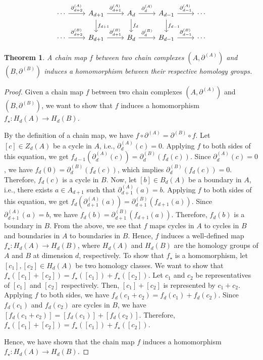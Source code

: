 \documentclass{amsart}
\newtheorem{theorem}[section]{Theorem}
\begin{document}
\begin{equation}
\begin{tikzcd}
\cdots \arrow[r, "\partial^{(A)}_{d+2}"] & A_{d+1} \arrow[r, "\partial^{(A)}_{d+1}"] \arrow[d, "f_{d+1}"] & A_d \arrow[r, "\partial^{(A)}_{d}"] \arrow[d, "f_d"] & A_{d-1} \arrow[r, "\partial^{(A)}_{d-1}"] \arrow[d, "f_{d-1}"] & \cdots \\
\cdots \arrow[r, "\partial^{(B)}_{d+2}"] & B_{d+1} \arrow[r, "\partial^{(B)}_{d+1}"]                                  & B_d \arrow[r, "\partial^{(B)}_d"]                              & B_{d-1} \arrow[r, "\partial^{(B)}_{d-1}"]                                  & \cdots
\end{tikzcd}
\end{equation}

\begin{theorem}
\label{chainmaps}
A chain map $f$ between two chain complexes $(A, \partial^{(A)})$ and $(B,\partial^{(B)})$ induces a homomorphism between their respective homology groups.
\end{theorem}

\begin{proof}
Given a chain map $f$ between two chain complexes $(A, \partial^{(A)})$ and $(B,\partial^{(B)})$, we want to show that $f$ induces a homomorphism $f_\star: H_d(A) \rightarrow H_d(B)$.

By the definition of a chain map, we have $f \circ \partial^{(A)} = \partial^{(B)} \circ f$. Let $[c] \in Z_d(A)$ be a cycle in $A$, i.e., $\partial^{(A)}_d(c) = 0$. Applying $f$ to both sides of this equation, we get $f_{d-1}(\partial^{(A)}_d(c)) = \partial^{(B)}_d(f_d(c))$. Since $\partial^{(A)}_d(c) = 0$, we have $f_d(0) = \partial^{(B)}_d(f_d(c))$, which implies $\partial^{(B)}_d(f_d(c)) = 0$. Therefore, $f_d(c)$ is a cycle in $B$. Now, let $[b] \in B_d(A)$ be a boundary in $A$, i.e., there exists $a \in A_{d+1}$ such that $\partial^{(A)}_{d+1}(a) = b$. Applying $f$ to both sides of this equation, we get $f_d(\partial^{(A)}_{d+1}(a)) = \partial^{(B)}_{d+1}(f_{d+1}(a))$. Since $\partial^{(A)}_{d+1}(a) = b$, we have $f_d(b) = \partial^{(B)}_{d+1}(f_{d+1}(a))$. Therefore, $f_d(b)$ is a boundary in $B$. From the above, we see that $f$ maps cycles in $A$ to cycles in $B$ and boundaries in $A$ to boundaries in $B$. Hence, $f$ induces a well-defined map $f_\star: H_d(A) \rightarrow H_d(B)$, where $H_d(A)$ and $H_d(B)$ are the homology groups of $A$ and $B$ at dimension $d$, respectively. To show that $f_\star$ is a homomorphism, let $[c_1], [c_2] \in H_d(A)$ be two homology classes. We want to show that $f_\star([c_1] + [c_2]) = f_\star([c_1]) + f_\star([c_2])$. Let $c_1$ and $c_2$ be representatives of $[c_1]$ and $[c_2]$ respectively. Then, $[c_1] + [c_2]$ is represented by $c_1 + c_2$. Applying $f$ to both sides, we have $f_d(c_1 + c_2) = f_d(c_1) + f_d(c_2)$. Since $f_d(c_1)$ and $f_d(c_2)$ are cycles in $B$, we have $[f_d(c_1 + c_2)] = [f_d(c_1)] + [f_d(c_2)]$. Therefore, $f_\star([c_1] + [c_2]) = f_\star([c_1]) + f_\star([c_2])$.

Hence, we have shown that the chain map $f$ induces a homomorphism $f_\star: H_d(A) \rightarrow H_d(B)$.
\end{proof}
\end{document}
